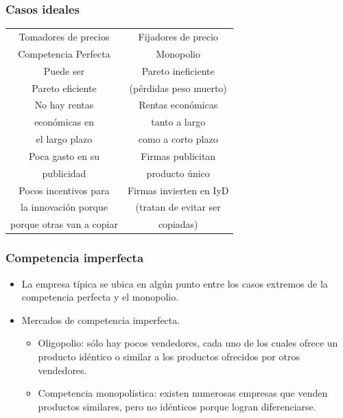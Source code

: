 \documentclass{beamer}
\begin{document}
\begin{frame}
\frametitle{Casos ideales}
\small
\begin{center}
    \begin{tabular}{c|c}
    \hline
    \hline
    Tomadores de precios & Fijadores de precio \\
    Competencia Perfecta & Monopolio
    \\
    \hline
    \hline
    Puede ser   & Pareto ineficiente \\ 
    Pareto eficiente & (pérdidas peso muerto)
    \\
    \hline
    No hay rentas & Rentas económicas \\
    económicas en & tanto a largo \\
    el largo plazo & como a corto plazo
    \\
    \hline
    Poca gasto en su & Firmas publicitan \\ publicidad & producto único 
    \\
    \hline
    Pocos incentivos para & Firmas invierten en IyD \\ 
    la innovación porque & (tratan de evitar ser \\
    porque otras van a copiar & copiadas)
\end{tabular}
\end{center}
\end{frame}

\begin{frame}
\frametitle{Competencia imperfecta}
\begin{itemize}
    \item La empresa típica se ubica en algún punto entre los casos extremos de la competencia perfecta y el monopolio.
    \item Mercados de competencia imperfecta.
    \begin{itemize}
        \item Oligopolio: sólo hay pocos vendedores, cada uno de los cuales ofrece un producto idéntico o similar a los productos ofrecidos por otros vendedores.
        \item Competencia monopolística: existen numerosas empresas que venden productos similares, pero no idénticos porque logran diferenciarse.
    \end{itemize}
    \end{itemize}
\end{frame}
\end{document}
